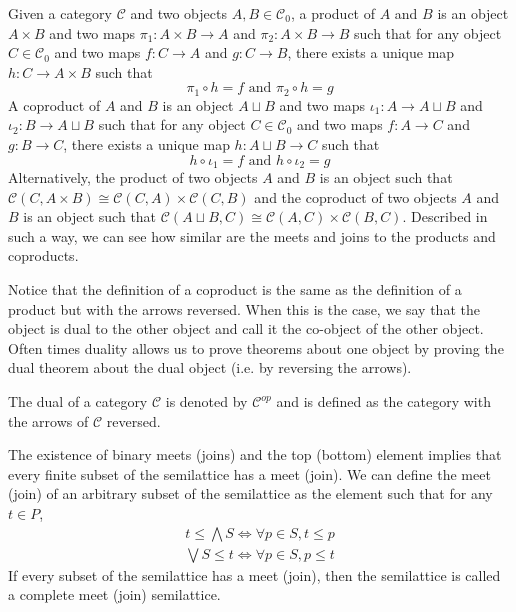\begin{definition}
    Given a category $\mathcal{C}$ and two objects $A,B\in\mathcal{C}_0$,
    a product of $A$ and $B$ is an object $A\times B$ and two maps
    $\pi_1:A\times B\to A$ and $\pi_2:A\times B\to B$ such that for any object $C\in\mathcal{C}_0$
    and two maps $f:C\to A$ and $g:C\to B$, there exists a unique map $h:C\to A\times B$ such that
    \[
        \pi_1\circ h=f\text{ and }\pi_2\circ h=g
    \]
    A coproduct of $A$ and $B$ is an object $A\sqcup B$ and two maps
    $\iota_1:A\to A\sqcup B$ and $\iota_2:B\to A\sqcup B$ such that for any object $C\in\mathcal{C}_0$
    and two maps $f:A\to C$ and $g:B\to C$, there exists a unique map $h:A\sqcup B\to C$ such that
    \[
        h\circ \iota_1=f\text{ and }h\circ \iota_2=g
    \]
    Alternatively,
    the product of two objects $A$ and $B$ is an object such that
$\mathcal{C}(C,A\times B)\cong \mathcal{C}(C,A)\times \mathcal{C}(C,B)$
and the coproduct of two objects $A$ and $B$ is an object such that
$\mathcal{C}(A\sqcup B,C)\cong \mathcal{C}(A,C)\times \mathcal{C}(B,C)$.
Described in such a way, we can see how similar are the meets and joins to the products and coproducts.

\end{definition}
\begin{remark}
    Notice that the definition of a coproduct is the same as the definition of a product
    but with the arrows reversed. When this is the case, we say that the object is dual
    to the other object and call it the co-object of the other object.
    Often times duality allows us to prove theorems about one object by proving the dual theorem
    about the dual object (i.e. by reversing the arrows).

    The dual of a category $\mathcal{C}$ is denoted by $\mathcal{C}^{op}$ and is defined as the category
    with the arrows of $\mathcal{C}$ reversed.
\end{remark}

The existence of binary meets (joins) and the top (bottom) element implies that every finite
subset of the semilattice has a meet (join).
We can define the meet (join) of an arbitrary subset of the semilattice
as the element such that for any $t\in P$,
\begin{gather*}
    t\leq \bigwedge S \iff \forall p\in S, t\leq p\\
    \bigvee S\leq t \iff \forall p\in S, p\leq t
\end{gather*}
If every subset of the semilattice has a meet (join), then the semilattice is called a complete meet (join) semilattice.

